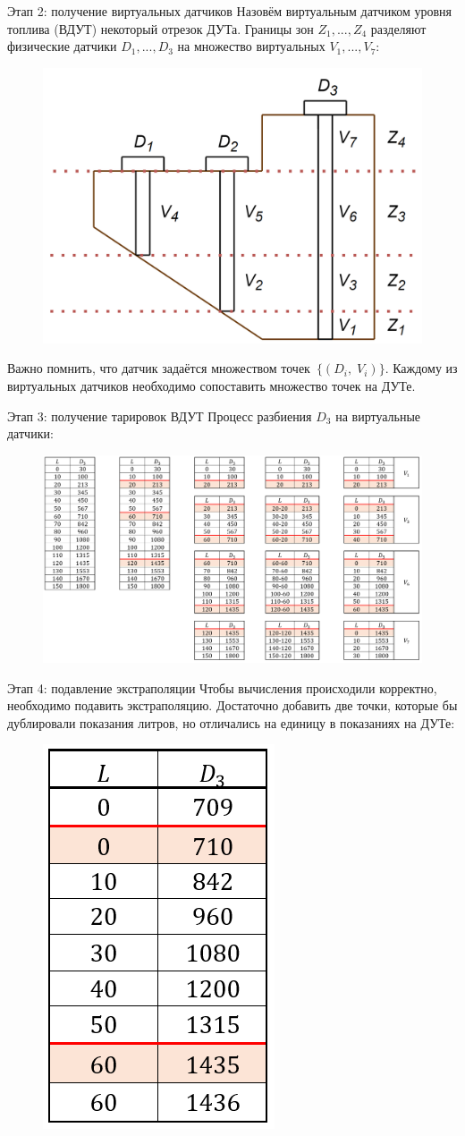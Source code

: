 \documentclass[usenames,dvipsnames,11pt]{beamer}
\begin{document}
\begin{frame}{Этап 2: получение виртуальных датчиков}
	Назовём виртуальным датчиком уровня топлива (ВДУТ) некоторый отрезок ДУТа. Границы зон $Z_1,..., Z_4$ разделяют физические датчики $D_1,...,D_3$ на множество виртуальных $V_1,...,V_7$: 
	\\
	\begin{figure}
		\centering
		\includegraphics[width=0.45\linewidth]{graphics/screenshot008}
	\end{figure}
	Важно помнить, что датчик задаётся множеством точек~$\{(D_i,\; V_i)\}$. Каждому из виртуальных датчиков необходимо сопоставить множество точек на ДУТе.
\end{frame}

\begin{frame}{Этап 3: получение тарировок ВДУТ}
	Процесс разбиения $D_3$ на виртуальные датчики:
	\begin{figure}
	\includegraphics[width=1.05\linewidth]{graphics/screenshot007}
	\end{figure}
\end{frame}

\begin{frame}{Этап 4: подавление экстраполяции}
	Чтобы вычисления происходили корректно, необходимо подавить экстраполяцию. Достаточно добавить две точки, которые бы дублировали показания литров, но отличались на единицу в показаниях на ДУТе:
	\begin{figure}
		\centering
		\includegraphics[width=0.2\linewidth]{graphics/screenshot009}
	\end{figure}
\end{frame}
\end{document}
